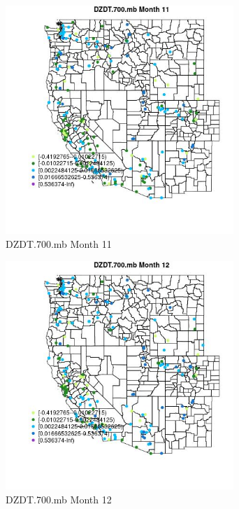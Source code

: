 \begin{figure} 
\centering  
\includegraphics[width=0.77\textwidth]{Code_Outputs/Report_ML_input_PM25_Step4_part_e_de_duplicated_aveswNAs_MapObsMo11DZDT700mb.jpg} 
\caption{\label{fig:Report_ML_input_PM25_Step4_part_e_de_duplicated_aveswNAsMapObsMo11DZDT700mb}DZDT.700.mb Month 11} 
\end{figure} 
 

\begin{figure} 
\centering  
\includegraphics[width=0.77\textwidth]{Code_Outputs/Report_ML_input_PM25_Step4_part_e_de_duplicated_aveswNAs_MapObsMo12DZDT700mb.jpg} 
\caption{\label{fig:Report_ML_input_PM25_Step4_part_e_de_duplicated_aveswNAsMapObsMo12DZDT700mb}DZDT.700.mb Month 12} 
\end{figure} 
 
